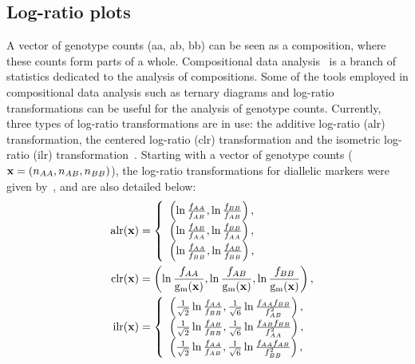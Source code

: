 \documentclass[nojss]{jss}
\begin{document}
\subsection{Log-ratio plots}
\label{subsec:log-ratio}
A vector of genotype counts ({\sc aa, ab, bb}) can be seen as a
composition, where these counts form parts of a whole. Compositional
data analysis~\citep{Aitchison} is a branch of statistics dedicated to
the analysis of compositions. Some of the tools employed in
compositional data analysis such as ternary diagrams and log-ratio
transformations can be useful for the analysis of genotype
counts. Currently, three types of log-ratio transformations are in use:
the additive log-ratio (alr) transformation, the centered log-ratio
(clr) transformation and the isometric log-ratio (ilr)
transformation~\citep{Egozcue2}. Starting with a vector of genotype
counts ($\mathbf x = (n_{AA}, n_{AB}, n_{BB})$), the log-ratio transformations for
diallelic markers were given by~\cite{Graffel21}, and are also
detailed below:
\begin{align}
\hspace{3mm} \mathrm{alr}(\mathbf{x}) & = \left\{ \begin{array}{l}
              \left( \ln \frac{f_{AA}}{f_{AB}}, \ln \frac{f_{BB}}{f_{AB}} \right),\\
              \left( \ln \frac{f_{AB}}{f_{AA}}, \ln \frac{f_{BB}}{f_{AA}} \right),\\
              \left( \ln \frac{f_{AA}}{f_{BB}}, \ln \frac{f_{AB}}{f_{BB}} \right),\\
               \end{array} \label{eq:alr}
       \right. \\
\hspace{3mm} \mathrm{clr}(\mathbf{x}) & = \left( \ln \frac{f_{AA}}{{\mathrm{g_m}}(\mathbf{x})}, \ln \frac{f_{AB}}{{\mathrm{g_m}}(\mathbf{x})}, \ln \frac{f_{BB}}{{\mathrm{g_m}}(\mathbf{x})} \right), \label{eq:clr}\\
\hspace{3mm} \mathrm{ilr}(\mathbf{x}) & = \left\{ \begin{array}{l}
              \left( \frac{1}{\sqrt{2}} \ln  \frac{f_{AA}}{f_{BB}}, \frac{1}{\sqrt{6}} \ln \frac{f_{AA} f_{BB}}{f_{AB}^2} \right),\\
              \left( \frac{1}{\sqrt{2}} \ln  \frac{f_{AB}}{f_{BB}}, \frac{1}{\sqrt{6}} \ln \frac{f_{AB} f_{BB}}{f_{AA}^2} \right),\\
              \left( \frac{1}{\sqrt{2}} \ln  \frac{f_{AA}}{f_{AB}}, \frac{1}{\sqrt{6}} \ln \frac{f_{AA} f_{AB}}{f_{BB}^2} \right),\\
               \end{array} \label{eq:ilr}
       \right. 
\end{align}
\end{document}

